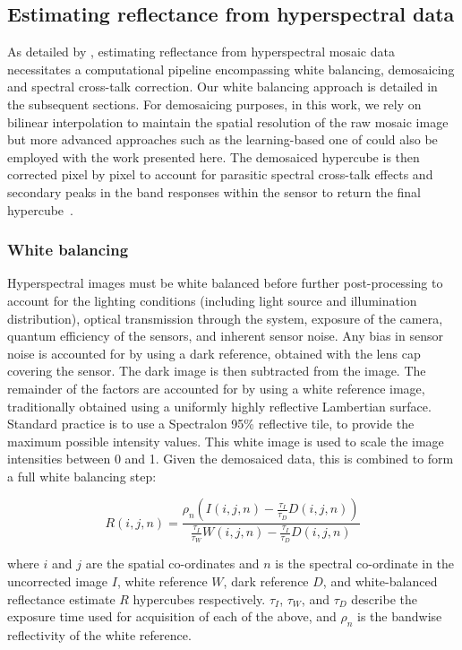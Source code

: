 %
\subsection{Estimating reflectance from hyperspectral data}
\label{methodnecessity}
%
As detailed by \citet{Pichette2017}, estimating reflectance from hyperspectral mosaic data necessitates a computational pipeline encompassing white balancing, demosaicing and spectral cross-talk correction.
%
%
Our white balancing approach is detailed in the subsequent sections.
For demosaicing purposes, in this work, we rely on bilinear interpolation to maintain the spatial resolution of the raw mosaic image but more advanced approaches such as the learning-based one of \citet{Li2021} could also be employed with the work presented here.
The demosaiced hypercube is then corrected pixel by pixel to account for parasitic spectral cross-talk effects and secondary peaks in the band responses within the sensor to return the final hypercube~\citep{Pichette2017}.

\subsubsection{White balancing}
\label{processingwhite}
Hyperspectral images must be white balanced before further post-processing to account for the lighting conditions (including light source and illumination distribution), optical transmission through the system, exposure of the camera, quantum efficiency of the sensors, and inherent sensor noise.
Any bias in sensor noise is accounted for by using a dark reference, obtained with the lens cap covering the sensor.
The dark image is then subtracted from the image.
The remainder of the factors are accounted for by using a white reference image, traditionally obtained using a uniformly highly reflective Lambertian surface.
Standard practice is to use a Spectralon 95\% reflective tile, to provide the maximum possible intensity values.
This white image is used to scale the image intensities between 0 and 1.
Given the demosaiced data, this is combined to form a full white balancing step:
%
%
\begin{linenomath*}
\begin{equation}
	R(i,j,n) = \frac{\rho_n\left(I(i,j,n) - \frac{\tau_I}{\tau_D}D(i,j,n)\right)}{\frac{\tau_I}{\tau_W}W(i,j,n) - \frac{\tau_I}{\tau_D}D(i,j,n)}
\label{eq:WBfull}
\end{equation}
\end{linenomath*}
where $i$ and $j$ are the spatial co-ordinates and $n$ is the spectral co-ordinate in the uncorrected image $I$, white reference $W$, dark reference $D$, and white-balanced reflectance estimate $R$ hypercubes respectively.
$\tau_I$, $\tau_W$, and $\tau_D$ describe the exposure time used for acquisition of each of the above, and $\rho_n$ is the bandwise reflectivity of the white reference.

